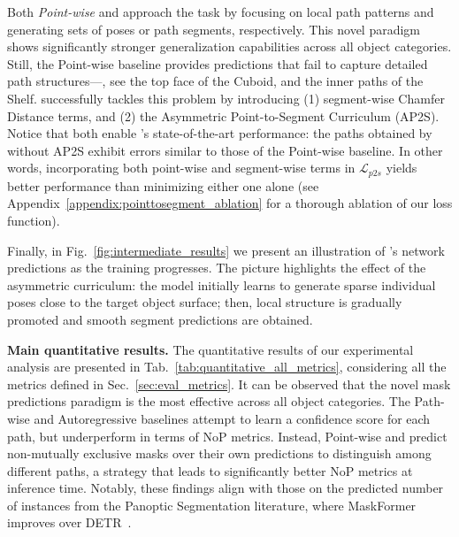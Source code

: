 Both \emph{Point-wise} and \ours approach the task by focusing on local path patterns and generating sets of poses or path segments, respectively. 
This novel paradigm shows significantly stronger generalization capabilities across all object categories.
Still, the Point-wise baseline provides predictions that fail to capture detailed path structures---\eg, see the top face of the Cuboid, and the inner paths of the Shelf.
%
\ours successfully tackles this problem by introducing (1) segment-wise Chamfer Distance terms, and (2) the Asymmetric Point-to-Segment Curriculum (AP2S). Notice that both enable \ours's state-of-the-art performance: the paths obtained by \ours without AP2S exhibit errors similar to those of the Point-wise baseline. In other words, incorporating both point-wise and segment-wise terms in $\mathcal{L}_{p2s}$ yields better performance than minimizing either one alone (see Appendix~\ref{appendix:pointtosegment_ablation} for a thorough ablation of our loss function).

Finally, in Fig.~\ref{fig:intermediate_results} we present an illustration of \ours's network predictions as the training progresses. The picture highlights the effect of the asymmetric curriculum: the model initially learns to generate sparse individual poses close to the target object surface; then, local structure is gradually promoted and smooth segment predictions are obtained.

\medskip
\noindent \textbf{Main quantitative results.}
The quantitative results of our experimental analysis are presented in Tab.~\ref{tab:quantitative_all_metrics}, considering all the metrics defined in Sec.~\ref{sec:eval_metrics}.
%
It can be observed that the novel mask predictions paradigm is the most effective across all object categories.
The Path-wise and Autoregressive baselines attempt to learn a confidence score for each path, but underperform in terms of NoP metrics.
%
Instead, Point-wise and \ours predict non-mutually exclusive masks over their own predictions to distinguish among different paths, a strategy that leads to significantly better NoP metrics at inference time.
Notably, these findings align with those on the predicted number of instances from the Panoptic Segmentation literature, where MaskFormer~\cite{cheng2021maskformer} improves over DETR~\cite{carion2020detr}.

